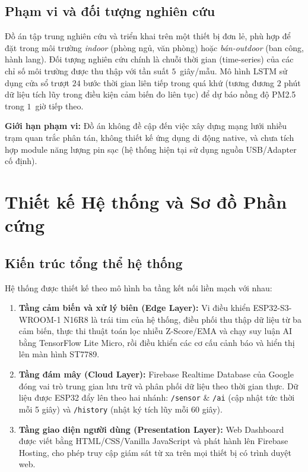 \documentclass[12pt,a4paper]{article}
\begin{document}
\subsection{Phạm vi và đối tượng nghiên cứu}

Đồ án tập trung nghiên cứu và triển khai trên một thiết bị đơn lẻ, phù hợp để đặt trong môi trường \textit{indoor} (phòng ngủ, văn phòng) hoặc \textit{bán-outdoor} (ban công, hành lang). Đối tượng nghiên cứu chính là chuỗi thời gian (time-series) của các chỉ số môi trường được thu thập với tần suất $5$~giây/mẫu. Mô hình LSTM sử dụng cửa sổ trượt $24$ bước thời gian liên tiếp trong quá khứ (tương đương $2$ phút dữ liệu tích lũy trong điều kiện cảm biến đo liên tục) để dự báo nồng độ PM2.5 trong $1$~giờ tiếp theo.

\textbf{Giới hạn phạm vi:} Đồ án không đề cập đến việc xây dựng mạng lưới nhiều trạm quan trắc phân tán, không thiết kế ứng dụng di động native, và chưa tích hợp module năng lượng pin sạc (hệ thống hiện tại sử dụng nguồn USB/Adapter cố định).

\newpage

\section{Thiết kế Hệ thống và Sơ đồ Phần cứng}

\subsection{Kiến trúc tổng thể hệ thống}

Hệ thống được thiết kế theo mô hình ba tầng kết nối liền mạch với nhau:

\begin{enumerate}
    \item \textbf{Tầng cảm biến và xử lý biên (Edge Layer):} Vi điều khiển ESP32-S3-WROOM-1 N16R8 là trái tim của hệ thống, điều phối thu thập dữ liệu từ ba cảm biến, thực thi thuật toán lọc nhiễu Z-Score/EMA và chạy suy luận AI bằng TensorFlow Lite Micro, rồi điều khiển các cơ cấu cảnh báo và hiển thị lên màn hình ST7789.
    \item \textbf{Tầng đám mây (Cloud Layer):} Firebase Realtime Database của Google đóng vai trò trung gian lưu trữ và phân phối dữ liệu theo thời gian thực. Dữ liệu được ESP32 đẩy lên theo hai nhánh: \texttt{/sensor} \& \texttt{/ai} (cập nhật tức thời mỗi 5 giây) và \texttt{/history} (nhật ký tích lũy mỗi 60 giây).
    \item \textbf{Tầng giao diện người dùng (Presentation Layer):} Web Dashboard được viết bằng HTML/CSS/Vanilla JavaScript và phát hành lên Firebase Hosting, cho phép truy cập giám sát từ xa trên mọi thiết bị có trình duyệt web.
\end{enumerate}
\end{document}
